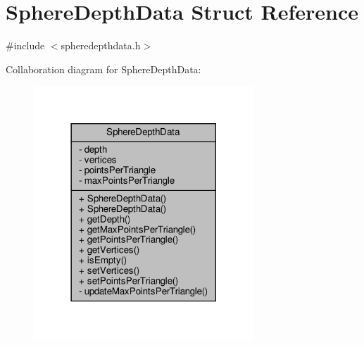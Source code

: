 \hypertarget{struct_sphere_depth_data}{}\section{Sphere\+Depth\+Data Struct Reference}
\label{struct_sphere_depth_data}


{\ttfamily \#include $<$spheredepthdata.\+h$>$}



Collaboration diagram for Sphere\+Depth\+Data\+:\nopagebreak
\begin{figure}[H]
\begin{center}
\leavevmode
\includegraphics[width=234pt]{d1/d26/struct_sphere_depth_data__coll__graph}
\end{center}
\end{figure}
